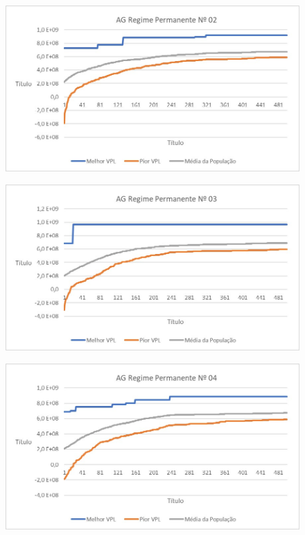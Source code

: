 \documentclass[12pt,a4paper]{report}
\begin{document}
\begin{figure}[H]
\centering

\includegraphics[scale=1]{ApC/AGRP/2}

\end{figure}
\begin{figure}[H]
\centering

\includegraphics[scale=1]{ApC/AGRP/3}

\end{figure}
\begin{figure}[H]
\centering

\includegraphics[scale=1]{ApC/AGRP/4}

\end{figure}
\end{document}
